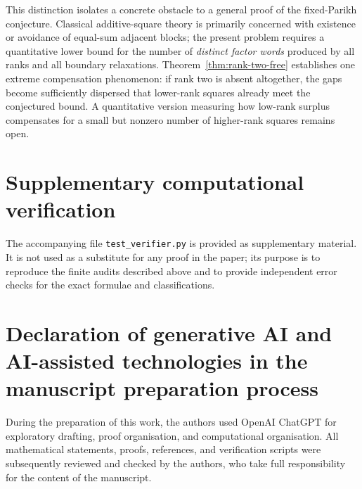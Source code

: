 \documentclass[11pt]{article}
\theoremstyle{definition}
\begin{document}
This distinction isolates a concrete obstacle to a general proof of the fixed-Parikh conjecture.  Classical additive-square theory is primarily concerned with existence or avoidance of equal-sum adjacent blocks; the present problem requires a quantitative lower bound for the number of \emph{distinct factor words} produced by all ranks and all boundary relaxations.  Theorem~\ref{thm:rank-two-free} establishes one extreme compensation phenomenon: if rank two is absent altogether, the gaps become sufficiently dispersed that lower-rank squares already meet the conjectured bound.  A quantitative version measuring how low-rank surplus compensates for a small but nonzero number of higher-rank squares remains open.

\section*{Supplementary computational verification}
The accompanying file \texttt{test\_verifier.py} is provided as supplementary material.  It is not used as a substitute for any proof in the paper; its purpose is to reproduce the finite audits described above and to provide independent error checks for the exact formulae and classifications.

\section*{Declaration of generative AI and AI-assisted technologies in the manuscript preparation process}
During the preparation of this work, the authors used OpenAI ChatGPT for exploratory drafting, proof organisation, and computational organisation.  All mathematical statements, proofs, references, and verification scripts were subsequently reviewed and checked by the authors, who take full responsibility for the content of the manuscript.



\end{document}
